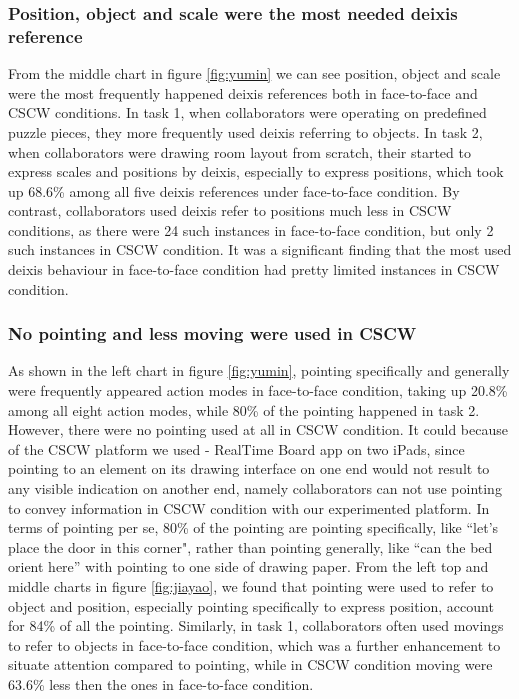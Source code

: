 \documentclass[12pt,twoside]{article}
\begin{document}
\subsubsection{Position, object and scale were the most needed deixis reference}

From the middle chart in figure \ref{fig:yumin} we can see position, object and scale were the most frequently happened deixis references both in face-to-face and CSCW conditions. In task 1, when collaborators were operating on predefined puzzle pieces, they more frequently used deixis referring to objects. In task 2, when collaborators were drawing room layout from scratch, their started to express scales and positions by deixis, especially to express positions, which took up 68.6\% among all five deixis references under face-to-face condition. By contrast, collaborators used deixis refer to positions much less in CSCW conditions, as there were 24 such instances in face-to-face condition, but only 2 such instances in CSCW condition. It was a significant finding that the most used deixis behaviour in face-to-face condition had pretty limited instances in CSCW condition.

\subsubsection{No pointing and less moving were used in CSCW}
As shown in the left chart in figure \ref{fig:yumin}, pointing specifically and generally were frequently appeared action modes in face-to-face condition, taking up 20.8\% among all eight action modes, while 80\% of the pointing happened in task 2. However, there were no pointing used at all in CSCW condition. It could because of the CSCW platform we used - RealTime Board app on two iPads, since pointing to an element on its drawing interface on one end would not result to any visible indication on another end, namely collaborators can not use pointing to convey information in CSCW condition with our experimented platform. In terms of pointing per se, 80\% of the pointing are pointing specifically, like ``let's place the door in this corner", rather than pointing generally, like ``can the bed orient here'' with pointing to one side of drawing paper. From the left top and middle charts in figure \ref{fig:jiayao}, we found that pointing were used to refer to object and position, especially pointing specifically to express position, account for 84\% of all the pointing. Similarly, in task 1, collaborators often used movings to refer to objects in face-to-face condition, which was a further enhancement to situate attention compared to pointing, while in CSCW condition moving were 63.6\% less then the ones in face-to-face condition.
\end{document}
